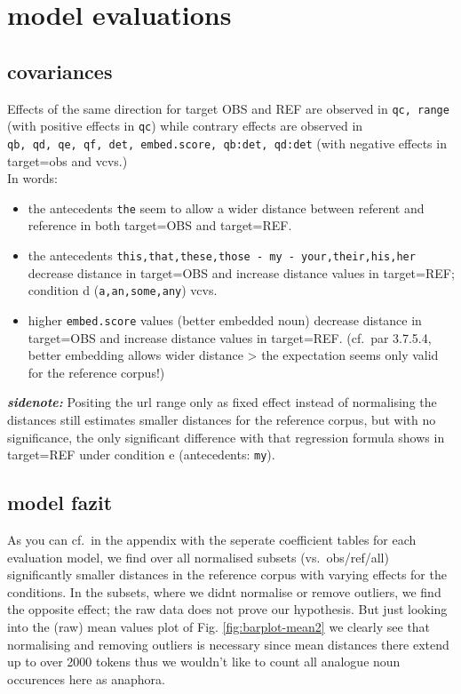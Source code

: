 \documentclass[
  12pt,
  oneside]{book}
\providecommand{\tightlist}{%
  \setlength{\itemsep}{0pt}\setlength{\parskip}{0pt}}
\begin{document}
\section{model evaluations}\label{model-evaluations}

\subsection{covariances}\label{covariances}

Effects of the same direction for target OBS and REF are observed in \texttt{qc,\ range} (with positive effects in \texttt{qc}) while contrary effects are observed in \texttt{qb,\ qd,\ qe,\ qf,\ det,\ embed.score,\ qb:det,\ qd:det} (with negative effects in target=obs and vcvs.)\\
In words:

\begin{itemize}
\tightlist
\item
  the antecedents \texttt{the} seem to allow a wider distance between referent and reference in both target=OBS and target=REF.
\item
  the antecedents \texttt{this,that,these,those\ -\ my\ -\ your,their,his,her} decrease distance in target=OBS and increase distance values in target=REF; condition d (\texttt{a,an,some,any}) vcvs.\\
\item
  higher \texttt{embed.score} values (better embedded noun) decrease distance in target=OBS and increase distance values in target=REF. (cf.~par 3.7.5.4, better embedding allows wider distance \textgreater{} the expectation seems only valid for the reference corpus!)
\end{itemize}

\textbf{\emph{sidenote:}} Positing the url range only as fixed effect instead of normalising the distances still estimates smaller distances for the reference corpus, but with no significance, the only significant difference with that regression formula shows in target=REF under condition e (antecedents: \texttt{my}).

\subsection{model fazit}\label{model-fazit}

As you can cf.~in the appendix with the seperate coefficient tables for each evaluation model, we find over all normalised subsets (vs.~obs/ref/all) significantly smaller distances in the reference corpus with varying effects for the conditions. In the subsets, where we didnt normalise or remove outliers, we find the opposite effect; the raw data does not prove our hypothesis. But just looking into the (raw) mean values plot of Fig. \ref{fig:barplot-mean2} we clearly see that normalising and removing outliers is necessary since mean distances there extend up to over 2000 tokens thus we wouldn't like to count all analogue noun occurences here as anaphora.
\end{document}
